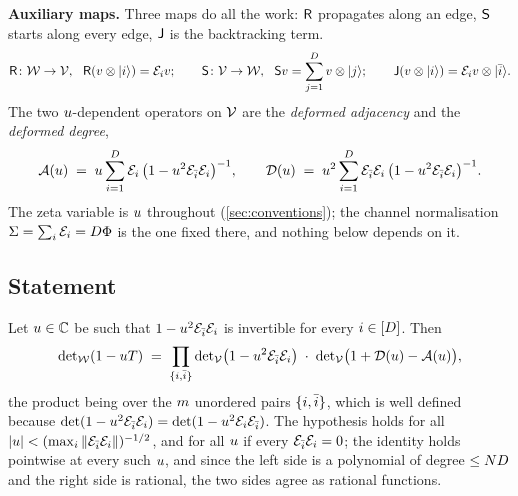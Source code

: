 \noindent\textbf{Auxiliary maps.} Three maps do all the work: $\mathsf R$ propagates along an edge, $\mathsf S$ starts along
every edge, $\mathsf J$ is the backtracking term.
\[
  \Rmap\colon\Wsp\to\Vsp,\ \ \Rmap(v\otimes|i\rangle) = \Eop{i}v;\qquad
  \Smap\colon\Vsp\to\Wsp,\ \ \Smap v = \sum_{j=1}^{\Dk} v\otimes|j\rangle;\qquad
  \Jrev(v\otimes|i\rangle) = \Eop{i}v\otimes|\bari{i}\rangle .
\]
The two $u$-dependent operators on $\mathcal V$ are the \emph{deformed adjacency} and the \emph{deformed degree},
\[
  \mathcal A(u) \;=\; u\sum_{i=1}^{D}\mathcal E_{i}\,\big(1-u^2\mathcal E_{\bar{i}}\mathcal E_{i}\big)^{-1},\qquad
  \mathcal D(u) \;=\; u^2\sum_{i=1}^{D}\mathcal E_{\bar{i}}\mathcal E_{i}\,\big(1-u^2\mathcal E_{\bar{i}}\mathcal E_{i}\big)^{-1}.
\]
The zeta variable is $u$ throughout (\cref{sec:conventions}); the channel normalisation $\Sigma = \sum_i\mathcal E_{i} =
D\Phi$ is the one fixed there, and nothing below depends on it.

\subsection{Statement}

\begin{theorem}
\label{thm:qihara-general}
Let $u\in\mathbb C$ be such that $1-u^2\mathcal E_{\bar{i}}\mathcal E_{i}$ is invertible for every $i\in[D]$. Then
\[
  \det\nolimits_{\mathcal W}(1-uT) \;=\;
  \prod_{\{i,\bar{i}\}}\det\nolimits_{\mathcal V}\!\big(1-u^2\mathcal E_{\bar{i}}\mathcal E_{i}\big)\;\cdot\;
  \det\nolimits_{\mathcal V}\!\big(1+\mathcal D(u)-\mathcal A(u)\big),
\]
the product being over the $m$ unordered pairs $\{i,\bar{i}\}$, which is well defined because
$\det(1-u^2\mathcal E_{\bar{i}}\mathcal E_{i}) = \det(1-u^2\mathcal E_{i}\mathcal E_{\bar{i}})$. The hypothesis holds for all
$|u| < (\max_i\|\mathcal E_{\bar{i}}\mathcal E_{i}\|)^{-1/2}$, and for all $u$ if every $\mathcal E_{\bar{i}}\mathcal E_{i} = 0$; the
identity holds pointwise at every such $u$, and since the left side is a polynomial of degree $\le ND$ and the
right side is rational, the two sides agree as rational functions.
\end{theorem}

